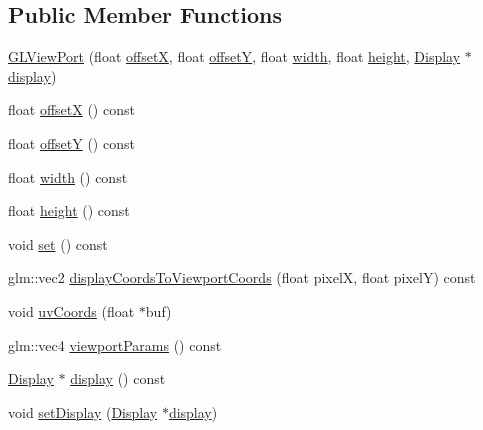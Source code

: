 \subsection*{Public Member Functions}
\begin{DoxyCompactItemize}
\item 
\hyperlink{classmotorcar_1_1GLCamera_1_1GLViewPort_a2a9a7ad54eb7e67f5af14961f5e4d473}{G\-L\-View\-Port} (float \hyperlink{classmotorcar_1_1GLCamera_1_1GLViewPort_aec8c3cbf2330c52f6385fd35069057b5}{offset\-X}, float \hyperlink{classmotorcar_1_1GLCamera_1_1GLViewPort_a78b27abaa97aa9723ef16f03bf88422e}{offset\-Y}, float \hyperlink{classmotorcar_1_1GLCamera_1_1GLViewPort_aec2452a157f3d629989ee1ced1c8e16f}{width}, float \hyperlink{classmotorcar_1_1GLCamera_1_1GLViewPort_a8e2b20f86f8c60e2b1088802b84ecd40}{height}, \hyperlink{classmotorcar_1_1Display}{Display} $\ast$\hyperlink{classmotorcar_1_1GLCamera_1_1GLViewPort_a343c2e115a4bbce95ada0fddaff5e75c}{display})
\item 
float \hyperlink{classmotorcar_1_1GLCamera_1_1GLViewPort_aec8c3cbf2330c52f6385fd35069057b5}{offset\-X} () const 
\item 
float \hyperlink{classmotorcar_1_1GLCamera_1_1GLViewPort_a78b27abaa97aa9723ef16f03bf88422e}{offset\-Y} () const 
\item 
float \hyperlink{classmotorcar_1_1GLCamera_1_1GLViewPort_aec2452a157f3d629989ee1ced1c8e16f}{width} () const 
\item 
float \hyperlink{classmotorcar_1_1GLCamera_1_1GLViewPort_a8e2b20f86f8c60e2b1088802b84ecd40}{height} () const 
\item 
void \hyperlink{classmotorcar_1_1GLCamera_1_1GLViewPort_aec5823d6424494e28c6401b5f1032a7a}{set} () const 
\item 
glm\-::vec2 \hyperlink{classmotorcar_1_1GLCamera_1_1GLViewPort_a4195ec0a3331334610640ad1b263e6d0}{display\-Coords\-To\-Viewport\-Coords} (float pixel\-X, float pixel\-Y) const 
\item 
void \hyperlink{classmotorcar_1_1GLCamera_1_1GLViewPort_a615221d4cf7d6edb3c5058e71fff7c42}{uv\-Coords} (float $\ast$buf)
\item 
glm\-::vec4 \hyperlink{classmotorcar_1_1GLCamera_1_1GLViewPort_a5e4c93af53e746fe1dfd187692c0e3c7}{viewport\-Params} () const 
\item 
\hyperlink{classmotorcar_1_1Display}{Display} $\ast$ \hyperlink{classmotorcar_1_1GLCamera_1_1GLViewPort_a343c2e115a4bbce95ada0fddaff5e75c}{display} () const 
\item 
void \hyperlink{classmotorcar_1_1GLCamera_1_1GLViewPort_af061ba79f2457c42a8cd66587c98faf5}{set\-Display} (\hyperlink{classmotorcar_1_1Display}{Display} $\ast$\hyperlink{classmotorcar_1_1GLCamera_1_1GLViewPort_a343c2e115a4bbce95ada0fddaff5e75c}{display})
\end{DoxyCompactItemize}



